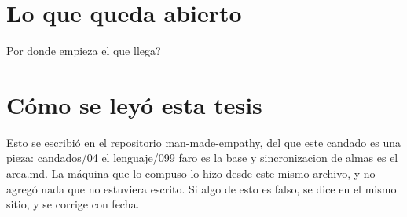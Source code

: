 \documentclass[11pt,a4paper]{article}
\begin{document}
\section{Lo que queda abierto}
\textquestiondown{}Por donde empieza el que llega?

\section*{Cómo se leyó esta tesis}
Esto se escribió en el repositorio man-made-empathy, del que este candado es una pieza: candados/04 el lenguaje/099 faro es la base y sincronizacion de almas es el area.md. La máquina que lo compuso lo hizo desde este mismo archivo, y no agregó nada que no estuviera escrito. Si algo de esto es falso, se dice en el mismo sitio, y se corrige con fecha.
\end{document}
